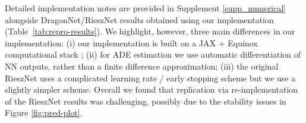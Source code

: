 Detailed implementation notes are provided in Supplement \ref{supp_numerical} alongside DragonNet/RieszNet results obtained using our implementation (Table~\ref{tab:repro-results}). We highlight, however, three main differences in our implementation: (i) our implementation is built on a JAX + Equinox computational stack \citep{jax2018github,kidger2021equinox}; (ii) for ADE estimation we use automatic differentiation of NN outputs, rather than a finite difference approximation; (iii) the original RieszNet uses a  complicated learning rate / early stopping scheme %
but we use a slightly simpler scheme.
Overall we found that replication via re-implementation of the RieszNet results was challenging, possibly due to the stability issues in Figure \ref{fig:pred-plot}.



